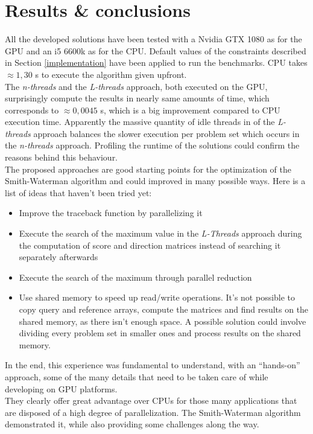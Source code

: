 \documentclass{article}
\begin{document}
\section{Results \& conclusions}
All the developed solutions have been tested with a Nvidia GTX 1080 as for the GPU and an i5 6600k as for the CPU. Default values of the constraints described in Section \ref{implementation} have been applied to run the benchmarks.
CPU takes \( \approx 1,30 \) s to execute the algorithm given upfront.\\
The \textit{n-threads} and the \textit{L-threads} approach, both executed on the GPU, surprisingly compute the results in nearly same amounts of time, which corresponds to \( \approx 0,0045 \) s, which is a big improvement compared to CPU execution time. Apparently the massive quantity of idle threads in of the \textit{L-threads} approach balances the slower execution per problem set which occurs in the \textit{n-threads} approach.
Profiling the runtime of the solutions could confirm the reasons behind this behaviour.\\
The proposed approaches are good starting points for the optimization of the Smith-Waterman algorithm and could improved in many possible ways. Here is a list of ideas that haven't been tried yet:
\begin{itemize}
    \item Improve the traceback function by parallelizing it
    \item Execute the search of the maximum value in the \textit{L-Threads} approach during the computation of score and direction matrices instead of searching it separately afterwards 
    \item Execute the search of the maximum through parallel reduction
    \item Use shared memory to speed up read/write operations. It's not possible to copy query and reference arrays, compute the matrices and find results on the shared memory, as there isn't enough space. A possible solution could involve dividing every problem set in smaller ones and process results on the shared memory.
\end{itemize}
In the end, this experience was fundamental to understand, with an ``hands-on'' approach, some of the many details that need to be taken care of while developing on GPU platforms.\\
They clearly offer great advantage over CPUs for those many applications that are disposed of a high degree of parallelization. The Smith-Waterman algorithm demonstrated it, while also providing some challenges along the way.
\end{document}

